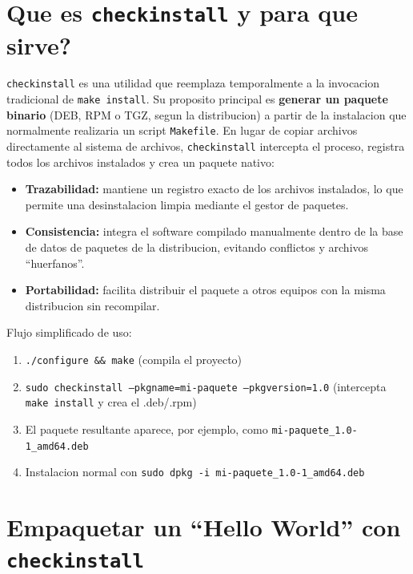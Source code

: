 \section{Que es \texttt{checkinstall} y para que sirve?}

\texttt{checkinstall} es una utilidad que reemplaza temporalmente a la invocacion tradicional de \texttt{make install}.  
Su proposito principal es \textbf{generar un paquete binario} (DEB, RPM o TGZ, segun la distribucion) a partir de la instalacion que normalmente realizaria un script \texttt{Makefile}.  
En lugar de copiar archivos directamente al sistema de archivos, \texttt{checkinstall} intercepta el proceso, registra todos los archivos instalados y crea un paquete nativo:

\begin{itemize}[nosep]
  \item \textbf{Trazabilidad:} mantiene un registro exacto de los archivos instalados, lo que permite una desinstalacion limpia mediante el gestor de paquetes.
  \item \textbf{Consistencia:} integra el software compilado manualmente dentro de la base de datos de paquetes de la distribucion, evitando conflictos y archivos ``huerfanos''.
  \item \textbf{Portabilidad:} facilita distribuir el paquete a otros equipos con la misma distribucion sin recompilar.
\end{itemize}

\bigskip
Flujo simplificado de uso:

\begin{enumerate}[label=\arabic*.]
  \item \texttt{./configure \&\& make} \hfill (compila el proyecto)
  \item \texttt{sudo checkinstall --pkgname=mi-paquete --pkgversion=1.0} \hfill (intercepta \texttt{make install} y crea el .deb/.rpm)
  \item El paquete resultante aparece, por ejemplo, como \texttt{mi-paquete\_1.0-1\_amd64.deb}
  \item Instalacion normal con \texttt{sudo dpkg -i mi-paquete\_1.0-1\_amd64.deb}
\end{enumerate}

\newpage

\section{Empaquetar un ``Hello World'' con \texttt{checkinstall}}

